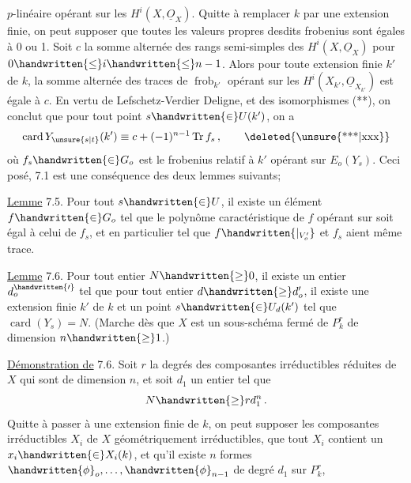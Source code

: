 $p$-linéaire opérant sur les $H^i(X,\underline{O}_X)$. Quitte à remplacer $k$ par une extension finie, on peut supposer que toutes les valeurs propres desdits frobenius sont égales à 0 ou 1. Soit $c$ la somme alternée  des rangs semi-simples des $H^i(X,\underline{O}_X)$ pour $0\handwritten{\leq}i\handwritten{\leq}n-1$. Alors pour toute extension finie $k'$ de $k$, la somme alternée des traces de $\operatorname{frob}_{k'}$ opérant sur les $H^i(X_{k'},\underline{O}_{X_{k'}})$ est  égale à $c$. En vertu de Lefschetz-Verdier Deligne, et des isomorphismes (**), on conclut que pour tout point $s\handwritten{\in}U(k')$, on a
\[
\operatorname{card}Y_{\unsure{s|t}}(k')\equiv c+(-1)^{n-1}\operatorname{Tr}f_s\,,
\tag*{\deleted{\unsure{***|xxx}}}
\]
où $f_s\handwritten{\in}G_o$ est  le frobenius relatif à $k'$ opérant sur $E_o(Y_s)$. Ceci posé, 7.1 est une conséquence des deux lemmes suivants;

\uline{Lemme} 7.5. Pour tout $s\handwritten{\in}U$, il existe un élément $f\handwritten{\in}G_o$  tel que le polynôme caractéristique de $f$ opérant sur  soit égal à celui de $f_s$, et en particulier tel que $f\handwritten{|_{V'_o}}$ et $f_s$ aient même trace.

\uline{Lemme} 7.6. Pour tout entier $N\handwritten{\geq}0$, il existe un entier $d^{\handwritten{\prime}}_o$  tel que pour tout entier $d\handwritten{\geq}d'_o$, il existe une extension finie $k'$ de $k$ et un point $s\handwritten{\in}U_d(k')$ tel que $\operatorname{card}(Y_s)=N$. (Marche dès que $X$ est un sous-schéma fermé de $P^r_k$ de dimension $n\handwritten{\geq}1$.)

\uline{Démonstration de} 7.6.  Soit $r$ la  degrés des composantes irréductibles réduites de $X$ qui sont de dimension $n$, et soit $d_1$ un entier tel que
\[
N\handwritten{\geq}rd_1^n\,.
\]
Quitte à passer à une extension finie de $k$, on peut supposer  les composantes irréductibles $X_i$ de $X$ géométriquement irréductibles, que tout $X_i$ contient un $x_i\handwritten{\in}X_i(k)$, et qu'il existe $n$ formes $\handwritten{\phi}_o,\ldots,\handwritten{\phi}_{n-1}$ de degré $d_1$ sur $P^r_k$,

